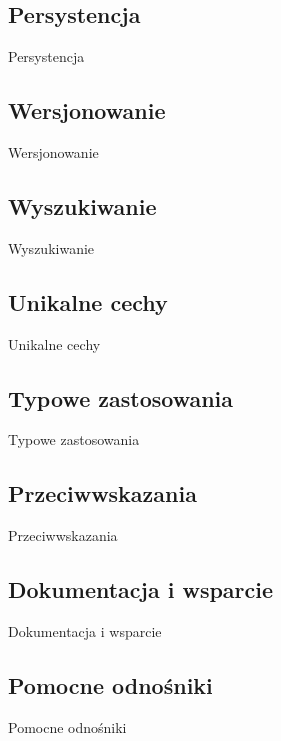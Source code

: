 \subsection*{Persystencja}

Persystencja

\subsection*{Wersjonowanie}

Wersjonowanie

\subsection*{Wyszukiwanie}

Wyszukiwanie

\subsection*{Unikalne cechy}

Unikalne cechy

\subsection*{Typowe zastosowania}

Typowe zastosowania

\subsection*{Przeciwwskazania}

Przeciwwskazania

\subsection*{Dokumentacja i wsparcie}

Dokumentacja i wsparcie

\subsection*{Pomocne odnośniki}
 
Pomocne odnośniki